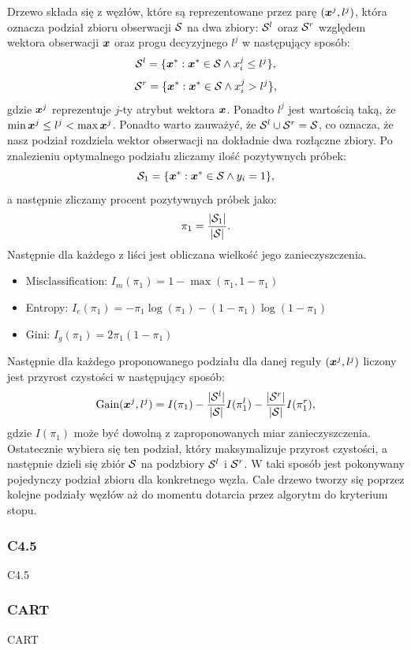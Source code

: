 \documentclass[inzynierska]{pwr_wmat_praca_dyplomowa}
\theoremstyle{plain}
\numberwithin{theorem}{chapter}
\theoremstyle{definition}
\numberwithin{theorem}{chapter}
\begin{document}
Drzewo składa się z węzłów, które są reprezentowane przez parę $(\boldsymbol{x}^j, l^j)$, która oznacza podział zbioru obserwacji $\mathcal{S}$ na dwa zbiory: $\mathcal{S}^{l}$ oraz $\mathcal{S}^{r}$ względem wektora obserwacji $\boldsymbol{x}$ oraz progu decyzyjnego $l^j$ w następujący sposób:
$$ \mathcal{S}^l = \{ \boldsymbol{x}^* : \boldsymbol{x}^* \in \mathcal{S} \land x^j_i \leq l^j \} \text{,} $$
$$ \mathcal{S}^r = \{ \boldsymbol{x}^* : \boldsymbol{x}^* \in \mathcal{S} \land x^j_i > l^j \} \text{,} $$
gdzie $\boldsymbol{x}^j$ reprezentuje $j$-ty atrybut wektora $\boldsymbol{x}$. Ponadto $l^j$ jest wartością taką, że $\min{\boldsymbol{x}^j} \leq l^j < \max{\boldsymbol{x}^j}$. Ponadto warto zauważyć, że $\mathcal{S}^l \cup \mathcal{S}^r = \mathcal{S}$, co oznacza, że nasz podział rozdziela wektor obserwacji na dokładnie dwa rozłączne zbiory.
Po znalezieniu optymalnego podziału zliczamy ilość pozytywnych próbek:
$$ \mathcal{S}_1  = \{ \boldsymbol{x}^* : \boldsymbol{x}^* \in \mathcal{S} \land y_i = 1 \} \text{,} $$
a następnie zliczamy procent pozytywnych próbek jako:
$$ \pi_1 = \frac{|\mathcal{S}_1|}{|\mathcal{S}|} \text{.}$$
Następnie dla każdego z liści jest obliczana wielkość jego zanieczyszczenia.
\begin{itemize}
	\item Misclassification: $I_m(\pi_1) = 1 - \max(\pi_1, 1 - \pi_1)$
	\item Entropy: $I_e(\pi_1) = -\pi_1 \log(\pi_1) - (1 - \pi_1) \log (1 - \pi_1)$
	\item Gini: $I_g(\pi_1) = 2 \pi_1 (1 - \pi_1)$
\end{itemize}{}
Następnie dla każdego proponowanego podziału dla danej reguły $(\boldsymbol{x}^j, l^j)$ liczony jest przyrost czystości w następujący sposób:
$$ \text{Gain}(\boldsymbol{x}^j, l^j) = I(\pi_1) - \frac{|\mathcal{S}^l|}{|\mathcal{S}|} I(\pi_1^l) - \frac{|\mathcal{S}^r|}{|\mathcal{S}|} I(\pi_1^r) \text{,}$$
gdzie $I(\pi_1)$ może być dowolną z zaproponowanych miar zanieczyszczenia.
Ostatecznie wybiera się ten podział, który maksymalizuje przyrost czystości, a następnie dzieli się zbiór $\mathcal{S}$ na podzbiory $\mathcal{S}^l$ i $\mathcal{S}^r$.
W taki sposób jest pokonywany pojedynczy podział zbioru dla konkretnego węzła. Całe drzewo tworzy się poprzez kolejne podziały węzłów aż do momentu dotarcia przez algorytm do kryterium stopu.

\subsubsection{C4.5}
C4.5
\subsubsection{CART}
CART
\end{document}
